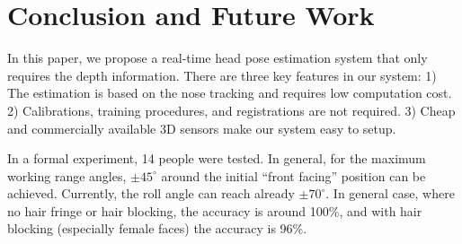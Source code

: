 \section{Conclusion and Future Work}
\label{sec:Conclusion}
In this paper, we propose a real-time head pose estimation system that only requires the depth information. There are three key features in our system: 1) The estimation is based on the nose tracking and requires low computation cost. 2) Calibrations, training procedures, and registrations are not required. 3) Cheap and commercially available 3D sensors make our system easy to setup.

In a formal experiment, 14 people were tested. In general, for the maximum working range angles, $\pm 45^{\circ}$ around the initial “front facing” position can be achieved. Currently, the roll angle can reach already $\pm 70^{\circ}$. In general case, where no hair fringe or hair blocking, the accuracy is around 100\%, and with hair blocking (especially female faces) the accuracy is 96\%.







